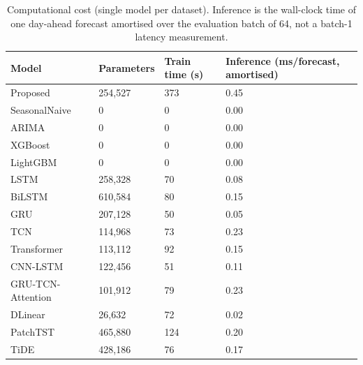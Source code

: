\begin{table}
\caption{Computational cost (single model per dataset). Inference is the wall-clock time of one day-ahead forecast amortised over the evaluation batch of 64, not a batch-1 latency measurement.}
\label{tab:efficiency}
\begin{tabular}{llll}
\toprule
Model & Parameters & Train time (s) & Inference (ms/forecast, amortised) \\
\midrule
Proposed & 254,527 & 373 & 0.45 \\
SeasonalNaive & 0 & 0 & 0.00 \\
ARIMA & 0 & 0 & 0.00 \\
XGBoost & 0 & 0 & 0.00 \\
LightGBM & 0 & 0 & 0.00 \\
LSTM & 258,328 & 70 & 0.08 \\
BiLSTM & 610,584 & 80 & 0.15 \\
GRU & 207,128 & 50 & 0.05 \\
TCN & 114,968 & 73 & 0.23 \\
Transformer & 113,112 & 92 & 0.15 \\
CNN-LSTM & 122,456 & 51 & 0.11 \\
GRU-TCN-Attention & 101,912 & 79 & 0.23 \\
DLinear & 26,632 & 72 & 0.02 \\
PatchTST & 465,880 & 124 & 0.20 \\
TiDE & 428,186 & 76 & 0.17 \\
\bottomrule
\end{tabular}
\end{table}
